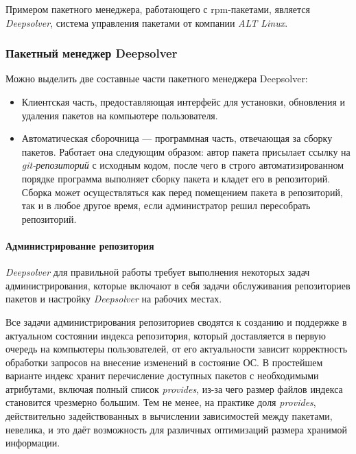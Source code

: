 Примером пакетного менеджера, работающего с rpm-пакетами, является \textit{Deepsolver}, система
управления пакетами от компании \textit{ALT Linux}.\\

\subsubsection{Пакетный менеджер Deepsolver}
Можно выделить две составные части пакетного менеджера Deepsolver:
\begin{itemize}
\item{Клиентская часть, предоставляющая интерфейс для установки, обновления
 и удаления пакетов на компьютере пользователя.}
\item{Автоматическая сборочница --- программная часть, отвечающая за сборку пакетов.
Работает она следующим образом: автор пакета присылает ссылку на \textit{git-репозиторий} с исходным кодом, %
после чего в строго автоматизированном порядке программа выполняет сборку пакета и кладет
его в репозиторий. Сборка может осуществляться как перед помещением пакета в репозиторий,
так и в любое другое время, если администратор решил пересобрать репозиторий.}
\end{itemize}

\paragraph{Администрирование репозитория\\} 
\textit{Deepsolver} для правильной работы требует выполнения некоторых задач 
администрирования, которые включают в себя задачи обслуживания репозиториев
пакетов и настройку \textit{Deepsolver} на рабочих местах.

Все задачи администрирования репозиториев сводятся к созданию и поддержке в
актуальном состоянии индекса репозитория, который доставляется в первую очередь на компьютеры
пользователей, от его актуальности зависит корректность обработки запросов 
на внесение изменений в состояние ОС. В простейшем варианте индекс
хранит перечисление доступных пакетов с необходимыми атрибутами, включая
полный список \textit{provides}, из-за чего размер файлов индекса становится
чрезмерно большим. Тем не менее, на практике доля \textit{provides}, действительно
задействованных в вычислении зависимостей между пакетами, невелика,
и это даёт возможность для различных оптимизаций размера хранимой информации.

